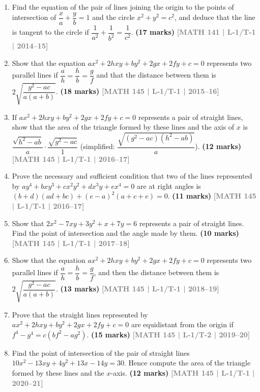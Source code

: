 \documentclass[12pt,a4paper]{article}
\newcommand{\yr}[1]{\hfill\textcolor{gray}{\small\textbf{[#1]}}}
\newcommand{\mk}[1]{\textcolor{orange!70!black}{\small\textbf{(#1 marks)}}}
\begin{document}
\begin{enumerate}
\item Find the equation of the pair of lines joining the origin to the points of intersection of $\dfrac{x}{a}+\dfrac{y}{b}=1$ and the circle $x^{2}+y^{2}=c^{2}$, and deduce that the line is tangent to the circle if $\dfrac{1}{a^{2}}+\dfrac{1}{b^{2}}=\dfrac{1}{c^{2}}$.
\mk{17} \yr{MATH 141 | L-1/T-1 | 2014--15}

\item Show that the equation $ax^{2}+2hxy+by^{2}+2gx+2fy+c=0$ represents two parallel lines if $\dfrac{a}{h}=\dfrac{h}{b}=\dfrac{g}{f}$ and that the distance between them is $2\sqrt{\dfrac{g^{2}-ac}{a(a+b)}}$.
\mk{18} \yr{MATH 145 | L-1/T-1 | 2015--16}

\item If $ax^{2}+2hxy+by^{2}+2gx+2fy+c=0$ represents a pair of straight lines, show that the area of the triangle formed by these lines and the axis of $x$ is $\dfrac{\sqrt{h^{2}-ab}}{a}\cdot\dfrac{\sqrt{g^{2}-ac}}{1}$ (simplified: $\dfrac{\sqrt{(g^{2}-ac)(h^{2}-ab)}}{a}$).
\mk{12} \yr{MATH 145 | L-1/T-1 | 2016--17}

\item Prove the necessary and sufficient condition that two of the lines represented by $ay^{4}+bxy^{3}+cx^{2}y^{2}+dx^{3}y+ex^{4}=0$ are at right angles is $(b+d)(ad+bc)+(e-a)^{2}(a+c+e)=0$.
\mk{11} \yr{MATH 145 | L-1/T-1 | 2016--17}

\item Show that $2x^{2}-7xy+3y^{2}+x+7y=6$ represents a pair of straight lines. Find the point of intersection and the angle made by them.
\mk{10} \yr{MATH 145 | L-1/T-1 | 2017--18}

\item Show that the equation $ax^{2}+2hxy+by^{2}+2gx+2fy+c=0$ represents two parallel lines if $\dfrac{a}{h}=\dfrac{h}{b}=\dfrac{g}{f}$, and then the distance between them is $2\sqrt{\dfrac{g^{2}-ac}{a(a+b)}}$.
\mk{13} \yr{MATH 145 | L-1/T-1 | 2018--19}

\item Prove that the straight lines represented by $ax^{2}+2hxy+by^{2}+2gx+2fy+c=0$ are equidistant from the origin if $f^{4}-g^{4}=c(bf^{2}-ag^{2})$.
\mk{15} \yr{MATH 145 | L-1/T-2 | 2019--20}

\item Find the point of intersection of the pair of straight lines $10x^{2}-13xy+4y^{2}+13x-14y=30$. Hence compute the area of the triangle formed by these lines and the $x$-axis.
\mk{12} \yr{MATH 145 | L-1/T-1 | 2020--21}


\end{enumerate}
\end{document}

